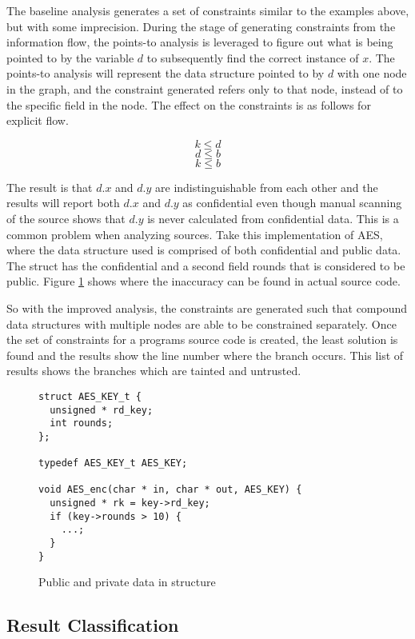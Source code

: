 The baseline analysis generates a set of constraints similar to the examples
above, but with some imprecision. During the stage of generating constraints
from the information flow, the points-to analysis is leveraged to figure out
what is being pointed to by the variable $d$ to subsequently find the correct
instance of $x$. The points-to analysis will represent the data structure
pointed to by $d$ with one node in the graph, and the constraint generated
refers only to that node, instead of to the specific field in the node. The
effect on the constraints is as follows for explicit flow.

\[
  k \leq d
\]
\[
  d \leq b
\]
\[
  k \leq b
\]

The result is that $d.x$ and $d.y$ are indistinguishable from each other and the
results will report both $d.x$ and $d.y$ as confidential even though manual
scanning of the source shows that $d.y$ is never calculated from confidential
data. This is a common problem when analyzing sources. Take this implementation
of AES, where the data structure used is comprised of both confidential and
public data. The  struct has the confidential  and a second field
rounds that is considered to be public. Figure \ref{alg:aesstruct} shows
where the inaccuracy can be found in actual source code.

So with the improved analysis, the constraints are generated such that compound
data structures with multiple nodes are able to be constrained separately. Once
the set of constraints for a programs source code is created, the least solution
is found and the results show the line number where the branch occurs. This list
of results shows the branches which are tainted and untrusted.

\begin{figure}[h!]
\begin{lstlisting}
struct AES_KEY_t {
  unsigned * rd_key;
  int rounds;
};

typedef AES_KEY_t AES_KEY;

void AES_enc(char * in, char * out, AES_KEY) {
  unsigned * rk = key->rd_key;
  if (key->rounds > 10) {
    ...;
  }
}
\end{lstlisting}
\caption{Public and private data in structure}
\label{alg:aesstruct}
\end{figure}

\subsection{Result Classification}

